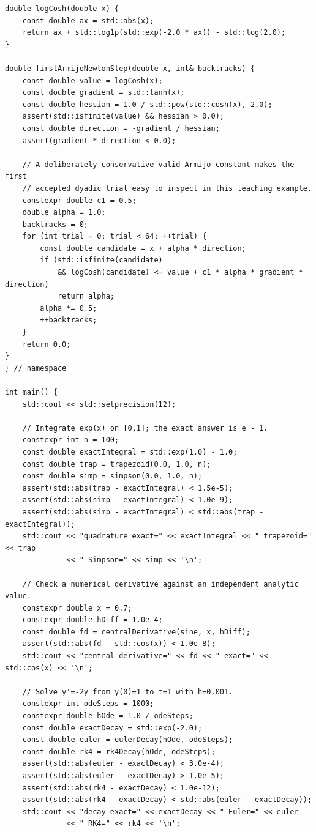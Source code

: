 \begin{verbatim}
double logCosh(double x) {
    const double ax = std::abs(x);
    return ax + std::log1p(std::exp(-2.0 * ax)) - std::log(2.0);
}

double firstArmijoNewtonStep(double x, int& backtracks) {
    const double value = logCosh(x);
    const double gradient = std::tanh(x);
    const double hessian = 1.0 / std::pow(std::cosh(x), 2.0);
    assert(std::isfinite(value) && hessian > 0.0);
    const double direction = -gradient / hessian;
    assert(gradient * direction < 0.0);

    // A deliberately conservative valid Armijo constant makes the first
    // accepted dyadic trial easy to inspect in this teaching example.
    constexpr double c1 = 0.5;
    double alpha = 1.0;
    backtracks = 0;
    for (int trial = 0; trial < 64; ++trial) {
        const double candidate = x + alpha * direction;
        if (std::isfinite(candidate)
            && logCosh(candidate) <= value + c1 * alpha * gradient * direction)
            return alpha;
        alpha *= 0.5;
        ++backtracks;
    }
    return 0.0;
}
} // namespace

int main() {
    std::cout << std::setprecision(12);

    // Integrate exp(x) on [0,1]; the exact answer is e - 1.
    constexpr int n = 100;
    const double exactIntegral = std::exp(1.0) - 1.0;
    const double trap = trapezoid(0.0, 1.0, n);
    const double simp = simpson(0.0, 1.0, n);
    assert(std::abs(trap - exactIntegral) < 1.5e-5);
    assert(std::abs(simp - exactIntegral) < 1.0e-9);
    assert(std::abs(simp - exactIntegral) < std::abs(trap - exactIntegral));
    std::cout << "quadrature exact=" << exactIntegral << " trapezoid=" << trap
              << " Simpson=" << simp << '\n';

    // Check a numerical derivative against an independent analytic value.
    constexpr double x = 0.7;
    constexpr double hDiff = 1.0e-4;
    const double fd = centralDerivative(sine, x, hDiff);
    assert(std::abs(fd - std::cos(x)) < 1.0e-8);
    std::cout << "central derivative=" << fd << " exact=" << std::cos(x) << '\n';

    // Solve y'=-2y from y(0)=1 to t=1 with h=0.001.
    constexpr int odeSteps = 1000;
    constexpr double hOde = 1.0 / odeSteps;
    const double exactDecay = std::exp(-2.0);
    const double euler = eulerDecay(hOde, odeSteps);
    const double rk4 = rk4Decay(hOde, odeSteps);
    assert(std::abs(euler - exactDecay) < 3.0e-4);
    assert(std::abs(euler - exactDecay) > 1.0e-5);
    assert(std::abs(rk4 - exactDecay) < 1.0e-12);
    assert(std::abs(rk4 - exactDecay) < std::abs(euler - exactDecay));
    std::cout << "decay exact=" << exactDecay << " Euler=" << euler
              << " RK4=" << rk4 << '\n';


\end{verbatim}

